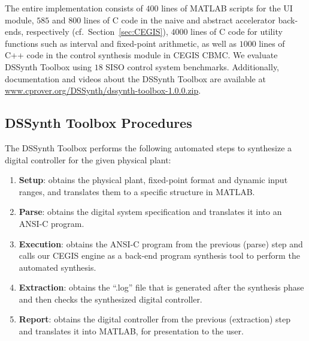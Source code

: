 \documentclass[conference]{IEEEtran}
\newcommand\tool{{DSSynth Toolbox}\xspace}
\begin{document}
The entire implementation consists of $400$ lines of MATLAB scripts for the
UI module, $585$ and $800$ lines of C code in the naive and abstract
accelerator back-ends, respectively (cf.~Section~\ref{sec:CEGIS}), $4000$
lines of C code for utility functions such as interval and fixed-point
arithmetic, as well as $1000$ lines of C++ code in the control synthesis
module in CEGIS CBMC.  We evaluate \tool using $18$ SISO control system
benchmarks.  Additionally, documentation and videos about the \tool are
available at \url{www.cprover.org/DSSynth/dssynth-toolbox-1.0.0.zip}.


\subsection{\tool Procedures}

The \tool performs the following automated steps
to synthesize a digital controller for the given physical plant:
%
\begin{enumerate}
%
\item \textbf{Setup}: obtains the physical plant, fixed-point format and
dynamic input ranges, and translates them to a specific structure in MATLAB.
%
\item \textbf{Parse}: obtains the digital system specification and translates 
it into an ANSI-C program.
%
\item \textbf{Execution}: obtains the ANSI-C program from the previous
(parse) step and calls our CEGIS engine as a back-end program synthesis tool
to perform the automated synthesis.
%
\item \textbf{Extraction}: obtains the ``.log'' file that is generated 
after the synthesis phase and then checks the synthesized digital controller.
%
\item \textbf{Report}: obtains the digital controller from the previous
(extraction) step and translates it into MATLAB, for presentation to the
user.
%
\end{enumerate}

\end{document}
